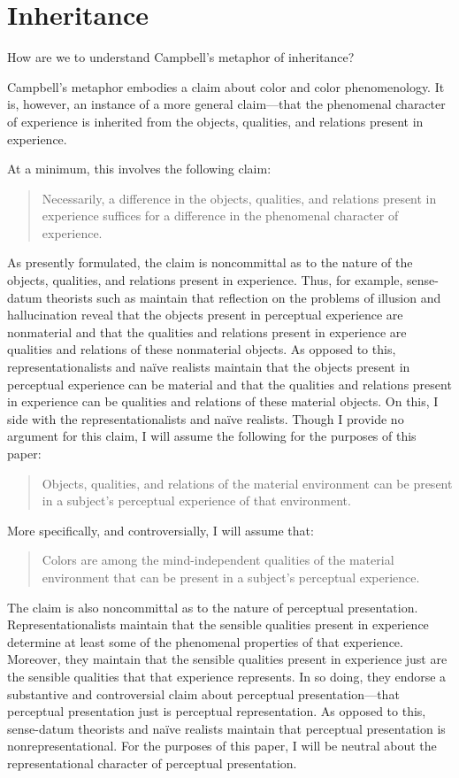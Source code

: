 \documentclass[12pt]{article}
\begin{document}
\section{Inheritance}\label{sec:inheritance} 

How are we to understand Campbell's metaphor of inheritance? 

Campbell's metaphor embodies a claim about color and color phenomenology. It is, however, an instance of a more general claim---that the phenomenal character of experience is inherited from the objects, qualities, and relations present in experience. 

At a minimum, this involves the following claim: 
\begin{quote}
	Necessarily, a difference in the objects, qualities, and relations present in experience suffices for a difference in the phenomenal character of experience. 
\end{quote}

As presently formulated, the claim is noncommittal as to the nature of the objects, qualities, and relations present in experience. Thus, for example, sense-datum theorists such as \citet{Price:1932fk} maintain that reflection on the problems of illusion and hallucination reveal that the objects present in perceptual experience are nonmaterial and that the qualities and relations present in experience are qualities and relations of these nonmaterial objects. As opposed to this, representationalists and na\"ive realists maintain that the objects present in perceptual experience can be material and that the qualities and relations present in experience can be qualities and relations of these material objects. On this, I side with the representationalists and na\"ive realists. Though I provide no argument for this claim, I will assume the following for the purposes of this paper: 
\begin{quote}
	Objects, qualities, and relations of the material environment can be present in a subject's perceptual experience of that environment. 
\end{quote}
More specifically, and controversially, I will assume that: 
\begin{quote}
	Colors are among the mind-independent qualities of the material environment that can be present in a subject's perceptual experience. 
\end{quote}

The claim is also noncommittal as to the nature of perceptual presentation. Representationalists maintain that the sensible qualities present in experience determine at least some of the phenomenal properties of that experience. Moreover, they maintain that the sensible qualities present in experience just are the sensible qualities that that experience represents. In so doing, they endorse a substantive and controversial claim about perceptual presentation---that perceptual presentation just is perceptual representation. As opposed to this, sense-datum theorists and na\"ive realists maintain that perceptual presentation is nonrepresentational. For the purposes of this paper, I will be neutral about the representational character of perceptual presentation.
\end{document}
